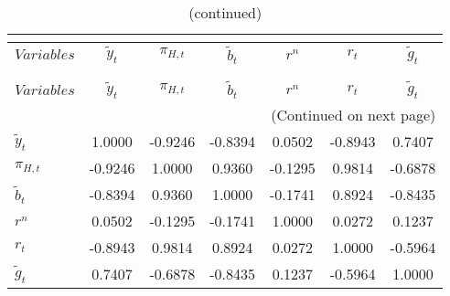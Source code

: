  
\begin{center}
\begin{longtable}{lcccccc} 
\caption{MATRIX OF CORRELATIONS}\\
 \label{Table:th_corr_matrix}\\
\toprule 
$Variables        $	 & 	 $   {\tilde{y}_{t}}$	 & 	 $       {\pi_{H,t}}$	 & 	 $     \tilde{b}_{t}$	 & 	 $            {r^{n}}$	 & 	 $            {r_{t}}$	 & 	 $     \tilde{g}_{t}$\\
\midrule \endfirsthead 
\caption{(continued)}\\
 \toprule \\ 
$Variables        $	 & 	 $   {\tilde{y}_{t}}$	 & 	 $       {\pi_{H,t}}$	 & 	 $     \tilde{b}_{t}$	 & 	 $            {r^{n}}$	 & 	 $            {r_{t}}$	 & 	 $     \tilde{g}_{t}$\\
\midrule \endhead 
\midrule \multicolumn{7}{r}{(Continued on next page)} \\ \bottomrule \endfoot 
\bottomrule \endlastfoot 
${\tilde{y}_{t}}  $	 & 	             1.0000	 & 	            -0.9246	 & 	            -0.8394	 & 	             0.0502	 & 	            -0.8943	 & 	             0.7407 \\ 
${\pi_{H,t}}      $	 & 	            -0.9246	 & 	             1.0000	 & 	             0.9360	 & 	            -0.1295	 & 	             0.9814	 & 	            -0.6878 \\ 
$\tilde{b}_{t}    $	 & 	            -0.8394	 & 	             0.9360	 & 	             1.0000	 & 	            -0.1741	 & 	             0.8924	 & 	            -0.8435 \\ 
${r^{n}}          $	 & 	             0.0502	 & 	            -0.1295	 & 	            -0.1741	 & 	             1.0000	 & 	             0.0272	 & 	             0.1237 \\ 
${r_{t}}          $	 & 	            -0.8943	 & 	             0.9814	 & 	             0.8924	 & 	             0.0272	 & 	             1.0000	 & 	            -0.5964 \\ 
$\tilde{g}_{t}    $	 & 	             0.7407	 & 	            -0.6878	 & 	            -0.8435	 & 	             0.1237	 & 	            -0.5964	 & 	             1.0000 \\ 
\end{longtable}
 \end{center}
